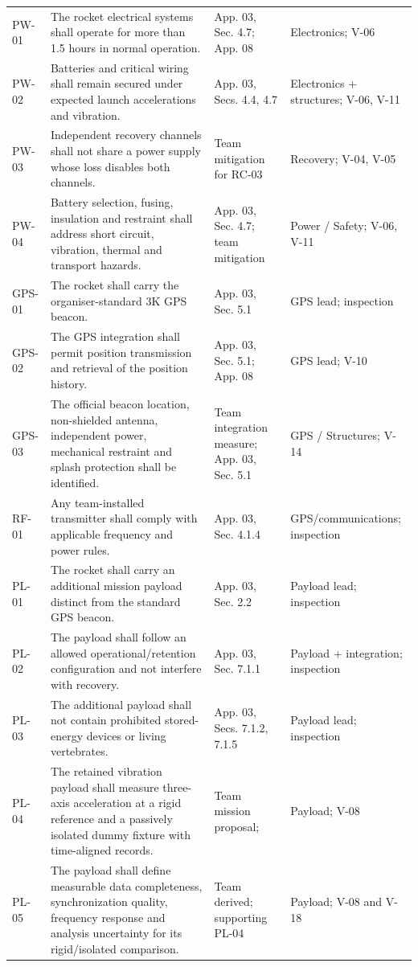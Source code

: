 \begin{longtable}{@{}L{12mm}L{71mm}L{33mm}L{34mm}@{}}
PW-01 & The rocket electrical systems shall operate for more than 1.5 hours in normal operation. & App. 03, Sec. 4.7; App. 08 & Electronics; V-06\\
PW-02 & Batteries and critical wiring shall remain secured under expected launch accelerations and vibration. & App. 03, Secs. 4.4, 4.7 & Electronics + structures; V-06, V-11\\
PW-03 & Independent recovery channels shall not share a power supply whose loss disables both channels. & Team mitigation for RC-03 & Recovery; V-04, V-05\\
PW-04 & Battery selection, fusing, insulation and restraint shall address short circuit, vibration, thermal and transport hazards. & App. 03, Sec. 4.7; team mitigation & Power / Safety; V-06, V-11\\
GPS-01 & The rocket shall carry the organiser-standard 3K GPS beacon. & App. 03, Sec. 5.1 & GPS lead; inspection\\
GPS-02 & The GPS integration shall permit position transmission and retrieval of the position history. & App. 03, Sec. 5.1; App. 08 & GPS lead; V-10\\
GPS-03 & The official beacon location, non-shielded antenna, independent power, mechanical restraint and splash protection shall be identified. & Team integration measure; App. 03, Sec. 5.1 & GPS / Structures; V-14\\
RF-01 & Any team-installed transmitter shall comply with applicable frequency and power rules. & App. 03, Sec. 4.1.4 & GPS/communications; inspection\\
PL-01 & The rocket shall carry an additional mission payload distinct from the standard GPS beacon. & App. 03, Sec. 2.2 & Payload lead; inspection\\
PL-02 & The payload shall follow an allowed operational/retention configuration and not interfere with recovery. & App. 03, Sec. 7.1.1 & Payload + integration; inspection\\
PL-03 & The additional payload shall not contain prohibited stored-energy devices or living vertebrates. & App. 03, Secs. 7.1.2, 7.1.5 & Payload lead; inspection\\
PL-04 & The retained vibration payload shall measure three-axis acceleration at a rigid reference and a passively isolated dummy fixture with time-aligned records. & Team mission proposal; \cite{tudsat2024frodo,rtc2027app07} & Payload; V-08\\
PL-05 & The payload shall define measurable data completeness, synchronization quality, frequency response and analysis uncertainty for its rigid/isolated comparison. & Team derived; supporting PL-04 & Payload; V-08 and V-18\\

\end{longtable}
